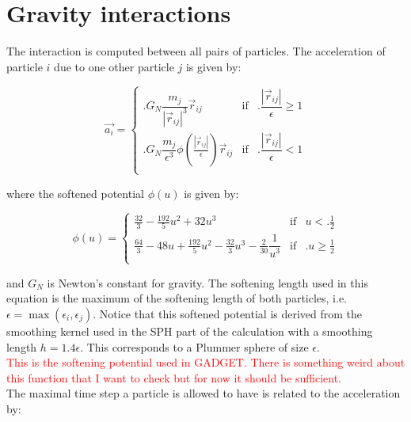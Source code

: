 \documentclass[a4paper,10pt]{report}
\begin{document}
\section{Gravity interactions}

The interaction is computed between all pairs of particles. The acceleration of particle $i$ due to one other particle
$j$ is given by:

\begin{equation}
 \vec{a_i} = \left\lbrace \begin{array}{rcl}
	   \Bigg. G_N\dfrac{m_j}{|\vec{r}_{ij}|^3}\vec{r}_{ij}& \mbox{if} & \Big.\dfrac{|\vec{r}_{ij}|}{\epsilon}
\geq 1 \\
         \Bigg. G_N\dfrac{m_j}{\epsilon^3}\phi\left(\frac{|\vec{r}_{ij}|}{\epsilon}\right)\vec{r}_{ij} & \mbox{if} &
\Big.\dfrac{|\vec{r}_{ij}|}{\epsilon} < 1 \\
                     \end{array}
\right.
\end{equation}

where the softened potential $\phi(u)$ is given by:

\begin{equation}
\phi(u) =  \left\lbrace \begin{array}{rcl}
	     \frac{32}{3} - \frac{192}{5}u^2 + 32u^3& \mbox{if} & u < \Big.\frac{1}{2}\\
	     \frac{64}{3} - 48u + \frac{192}{5} u^2 - \frac{32}{3}u^3  - \frac{2}{30}\dfrac{1}{u^3}& \mbox{if} & \Big.u
\geq \frac{1}{2}\\
                        \end{array}
\right.
\end{equation}

and $G_N$ is Newton's constant for gravity. The softening length used in this equation is the maximum of the softening
length of both particles, i.e. $\epsilon = \max(\epsilon_i, \epsilon_j)$. Notice that this softened potential is
derived from the smoothing kernel used in the SPH part of the calculation with a smoothing length $h=1.4\epsilon$. This
corresponds to a Plummer sphere of size $\epsilon$. \\


\textcolor{red}{This is the softening potential used in GADGET. There is something weird about this function that I want
to check but for now it should be sufficient.}\\

The maximal time step a particle is allowed to have is related to the acceleration by:
\end{document}
